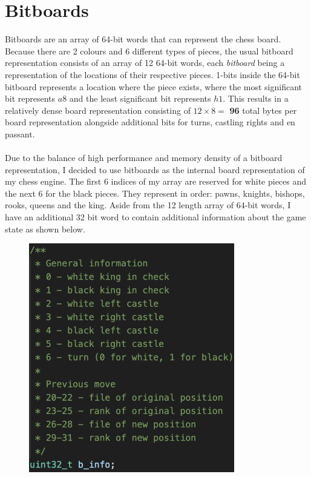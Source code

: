 \section{Bitboards}
Bitboards are an array of 64-bit words that can represent the chess board. Because there are 2 colours and 6 different types of pieces, the usual bitboard representation consists of an array of 12 64-bit words, each \textit{bitboard} being a representation of the locations of their respective pieces. 1-bits inside the 64-bit bitboard represents a location where the piece exists, where the most significant bit represents $a8$ and the least significant bit represents $h1$. This results in a relatively dense board representation consisting of $12 \times 8 =$ \textbf{96} total bytes per board representation alongside additional bits for turns, castling rights and en passant.\\\\
Due to the balance of high performance and memory density of a bitboard representation, I decided to use bitboards as the internal board representation of my chess engine. The first 6 indices of my array are reserved for white pieces and the next 6 for the black pieces. They represent in order: pawns, knights, bishops, rooks, queens and the king. Aside from the 12 length array of 64-bit words, I have an additional 32 bit word to contain additional information about the game state as shown below.

\begin{figure}[ht]
    \centering
    \includegraphics[width=0.8\textwidth]{images/sc1.png}
\end{figure}